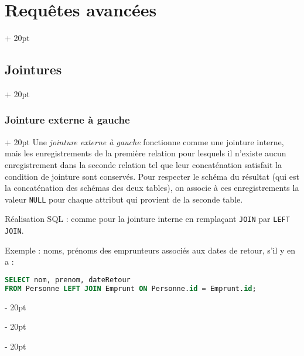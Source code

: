 \documentclass[a4paper, 12pt, twoside]{article}
\newcommand{\ind}[1][20pt]{\advance\leftskip + #1}
\newcommand{\deind}[1][20pt]{\advance\leftskip - #1}
\newenvironment{indt}[2][20pt]{#2 \par \ind[#1]}{\par \deind} %
\begin{document}
\begin{indt}{\section{Requêtes avancées}}
\begin{indt}{\subsection{Jointures}}
            \vspace{12pt}
            
            \begin{indt}{\subsubsection{Jointure externe à gauche}}
                Une \textit{jointure externe à gauche} fonctionne comme une jointure interne, mais les enregistrements de la première relation pour lesquels il n'existe aucun enregistrement dans la seconde relation tel que leur concaténation satisfait la condition de jointure sont conservés. Pour respecter le schéma du résultat (qui est la concaténation des schémas des deux tables), on associe à ces enregistrements la valeur \texttt{NULL} pour chaque attribut qui provient de la seconde table.

                Réalisation SQL : comme pour la jointure interne en remplaçant \texttt{JOIN} par \texttt{LEFT JOIN}.

                \vspace{12pt}
                
                Exemple : noms, prénoms des emprunteurs associés aux dates de retour, s'il y en a :

                \begin{lstlisting}[language=SQL, xleftmargin=80pt]
SELECT nom, prenom, dateRetour
FROM Personne LEFT JOIN Emprunt ON Personne.id = Emprunt.id;\end{lstlisting}

                \vspace{6pt}
                

\end{indt}
\end{indt}
\end{indt}
\end{document}
